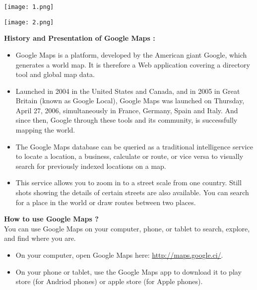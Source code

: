 \documentclass[10pt,a4paper]{report}
\begin{document}
\begin{center}
	\begin{minipage}{0.4\textwidth}
		\begin{flushleft}
    			\texttt{[image: 1.png]}
		\end{flushleft}
	\end{minipage}
	\begin{minipage}{0.4\textwidth}
		\begin{flushright}
			\texttt{[image: 2.png]}
		\end{flushright}
	\end{minipage}
\end{center} 


\textbf{History and Presentation of Google Maps :}
\begin{itemize}
\item Google Maps is a platform, developed by the American giant Google, which generates a world map. It is therefore a Web application covering a directory tool and global map data.
\item Launched in 2004 in the United States and Canada, and in 2005 in Great Britain (known as Google Local), Google Maps was launched on Thursday, April 27, 2006, simultaneously in France, Germany, Spain and Italy. And since then, Google through these tools and its community, is successfully mapping the world.
\item The Google Maps database can be queried as a traditional intelligence service to locate a location, a business, calculate or route, or vice versa to visually search for previously indexed locations on a map.
\item This service allows you to zoom in to a street scale from one country. Still shots showing the details of certain streets are also available. You can search for a place in the world or draw routes between two places.
\end{itemize}
\textbf{How to use Google Maps ?}\\
You can use Google Maps on your computer, phone, or tablet to search, explore, and find where you are. 
\begin{itemize}
\item On your computer, open Google Maps here: \textcolor{ao}{\href{http://maps.google.ci/}{http://maps.google.ci/}}.
\item On your phone or tablet, use the Google Maps app to download it to play store (for Andriod phones) or apple store (for Apple phones).
\end{itemize}
\end{document}

